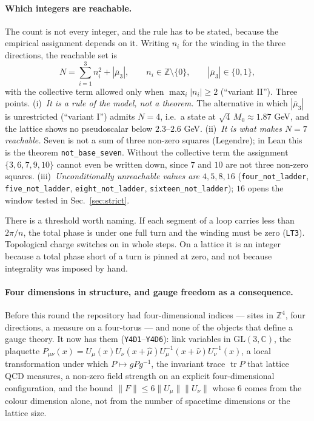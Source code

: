 \documentclass[aps,prd,preprint,superscriptaddress,amsmath,amssymb]{revtex4-2}
\begin{document}
\paragraph{Which integers are reachable.}
The count is not every integer, and the rule has to be stated, because the
empirical assignment depends on it.  Writing $n_i$ for the winding in the
three directions, the reachable set is
\begin{equation}
N=\sum_{i=1}^{3} n_i^2 + |\bar\mu_3|,
\qquad n_i\in\mathbb Z\setminus\{0\},\qquad |\bar\mu_3|\in\{0,1\},
\label{eq:ladder-rule}
\end{equation}
with the collective term allowed only when $\max_i|n_i|\ge 2$
(``variant II'').  Three points.
(i)~\emph{It is a rule of the model, not a theorem.}  The alternative in
which $|\bar\mu_3|$ is unrestricted (``variant I'') admits $N=4$, i.e.\ a
state at $\sqrt4\,M_0\approx1.87$ GeV, and the lattice shows no pseudoscalar
below $2.3$--$2.6$ GeV.
(ii)~\emph{It is what makes $N=7$ reachable.}  Seven is not a sum of three
non-zero squares (Legendre); in Lean this is the theorem
\texttt{not\_base\_seven}.  Without the collective term the assignment
$\{3,6,7,9,10\}$ cannot even be written down, since $7$ and $10$ are not
three non-zero squares.
(iii)~\emph{Unconditionally unreachable values are $4,5,8,16$}
(\texttt{four\_not\_ladder}, \texttt{five\_not\_ladder},
\texttt{eight\_not\_ladder}, \texttt{sixteen\_not\_ladder}); $16$ opens the
window tested in Sec.~\ref{sec:strict}.

There is a threshold worth naming.  If each segment of a loop carries less
than $2\pi/n$, the total phase is under one full turn and the winding must be
zero (\texttt{LT3}).  Topological charge switches on in whole steps.  On a
lattice it is an integer because a total phase short of a turn is pinned at
zero, and not because integrality was imposed by hand.

\paragraph{Four dimensions in structure, and gauge freedom as a consequence.}
Before this round the repository had four-dimensional indices --- sites in
$\mathbb{Z}^4$, four directions, a measure on a four-torus --- and none of the
objects that define a gauge theory.  It now has them (\texttt{Y4D1}--\texttt{Y4D6}):
link variables in $\mathrm{GL}(3,\mathbb{C})$, the plaquette
$P_{\mu\nu}(x)=U_\mu(x)U_\nu(x+\hat\mu)U^{-1}_\mu(x+\hat\nu)U^{-1}_\nu(x)$, a
local transformation under which $P\mapsto gPg^{-1}$, the invariant trace
$\operatorname{tr}P$ that lattice QCD measures, a non-zero field strength on
an explicit four-dimensional configuration, and the bound
$\|F\|\le 6\|U_\mu\|\|U_\nu\|$ whose $6$ comes from the colour dimension alone,
not from the number of spacetime dimensions or the lattice size.
\end{document}
